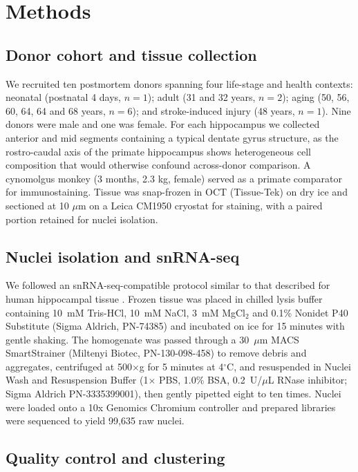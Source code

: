 \documentclass[11pt]{article}
\begin{document}
\section{Methods}

\subsection{Donor cohort and tissue collection}

We recruited ten postmortem donors spanning four life-stage and health
contexts: neonatal (postnatal 4 days, $n=1$); adult (31 and 32 years, $n=2$);
aging (50, 56, 60, 64, 64 and 68 years, $n=6$); and stroke-induced injury
(48 years, $n=1$). Nine donors were male and one was female. For each hippocampus
we collected anterior and mid segments containing a typical dentate gyrus
structure, as the rostro-caudal axis of the primate hippocampus shows
heterogeneous cell composition that would otherwise confound across-donor
comparison. A cynomolgus monkey (3 months, 2.3 kg, female) served as a
primate comparator for immunostaining. Tissue was snap-frozen in OCT
(Tissue-Tek) on dry ice and sectioned at 10 $\mu$m on a Leica CM1950
cryostat for staining, with a paired portion retained for nuclei isolation.

\subsection{Nuclei isolation and snRNA-seq}

We followed an snRNA-seq-compatible protocol similar to that described for
human hippocampal tissue \cite{ayhan2021protocol,habib2017massively}. Frozen
tissue was placed in chilled lysis buffer containing 10~mM Tris-HCl, 10~mM
NaCl, 3~mM MgCl$_2$ and 0.1\% Nonidet P40 Substitute (Sigma Aldrich,
PN-74385) and incubated on ice for 15 minutes with gentle shaking. The
homogenate was passed through a 30~$\mu$m MACS SmartStrainer (Miltenyi
Biotec, PN-130-098-458) to remove debris and aggregates, centrifuged at
500$\times$g for 5 minutes at 4$^\circ$C, and resuspended in Nuclei Wash and
Resuspension Buffer (1$\times$ PBS, 1.0\% BSA, 0.2~U/$\mu$L RNase inhibitor;
Sigma Aldrich PN-3335399001), then gently pipetted eight to ten times.
Nuclei were loaded onto a 10x Genomics Chromium controller and prepared
libraries were sequenced to yield 99{,}635 raw nuclei.

\subsection{Quality control and clustering}
\end{document}
